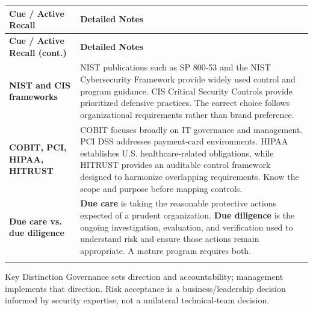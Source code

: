 \documentclass[10pt,letterpaper]{article}
\makeatletter
\newenvironment{cornell}
{\rowcolors{2}{white}{notebg}\begin{longtable}{@{}>{\raggedright\arraybackslash\columncolor{cuebg}\color{navy}\bfseries}p{0.285\textwidth}>{\raggedright\arraybackslash}p{0.65\textwidth}@{}}
\rowcolor{navy}\color{white}\textbf{Cue / Active Recall} & \color{white}\textbf{Detailed Notes}\\ \hline
\endfirsthead
\rowcolor{navy}\color{white}\textbf{Cue / Active Recall (cont.)} & \color{white}\textbf{Detailed Notes}\\ \hline
\endhead}
{\end{longtable}}
\newcommand{\noterow}[2]{#1 & #2\\\arrayrulecolor{line}\hline}
\makeatother
\begin{document}
\begin{cornell}
\noterow{NIST and CIS frameworks}{NIST publications such as SP 800-53 and the NIST Cybersecurity Framework provide widely used control and program guidance. CIS Critical Security Controls provide prioritized defensive practices. The correct choice follows organizational requirements rather than brand preference.}
\noterow{COBIT, PCI, HIPAA, HITRUST}{COBIT focuses broadly on IT governance and management. PCI DSS addresses payment-card environments. HIPAA establishes U.S. healthcare-related obligations, while HITRUST provides an auditable control framework designed to harmonize overlapping requirements. Know the scope and purpose before mapping controls.}
\noterow{Due care vs. due diligence}{\textbf{Due care} is taking the reasonable protective actions expected of a prudent organization. \textbf{Due diligence} is the ongoing investigation, evaluation, and verification used to understand risk and ensure those actions remain appropriate. A mature program requires both.}
\end{cornell}

\begin{exambox}{Key Distinction}
Governance sets direction and accountability; management implements that direction. Risk acceptance is a business/leadership decision informed by security expertise, not a unilateral technical-team decision.
\end{exambox}
\end{document}
